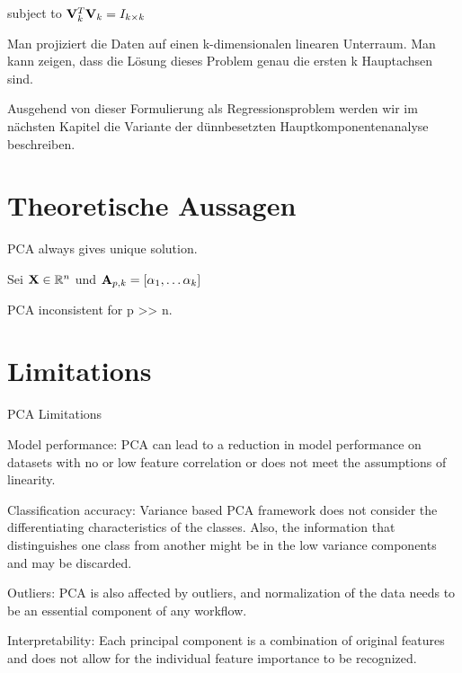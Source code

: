 subject to $\mathbf{V}_k^T\mathbf{V}_k = I_{k \times k}$

\cite{zou_sparsepca}

Man projiziert die Daten auf einen k-dimensionalen linearen Unterraum. Man kann zeigen, dass die Lösung dieses Problem genau die ersten k Hauptachsen sind.

Ausgehend von dieser Formulierung als Regressionsproblem werden wir im nächsten Kapitel die Variante der dünnbesetzten Hauptkomponentenanalyse beschreiben.

\section{Theoretische Aussagen}

\begin{thm}
PCA always gives unique solution.
\end{thm}

\begin{thm}
Sei $\mathbf{X} \in \mathbb{R}^n$ und $\mathbf{A}_{p,k} = [\alpha_1, \ldots \alpha_k] $   
\end{thm}

\begin{thm}
PCA inconsistent for p >> n.
\end{thm}

\section{Limitations}

PCA Limitations

Model performance: PCA can lead to a reduction in model performance on datasets with no or low feature correlation or does not meet the assumptions of linearity.

Classification accuracy: Variance based PCA framework does not consider the differentiating characteristics of the classes. Also, the information that distinguishes one class from another might be in the low variance components and may be discarded.

Outliers: PCA is also affected by outliers, and normalization of the data needs to be an essential component of any workflow.

Interpretability: Each principal component is a combination of original features and does not allow for the individual feature importance to be recognized.

